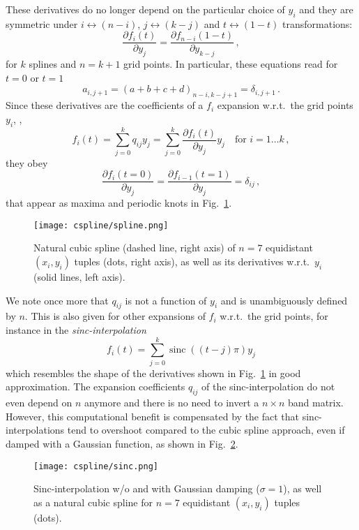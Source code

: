 These derivatives do no longer depend on the particular choice of $y_i$ and they are symmetric under $i \leftrightarrow (n-i)$, $j \leftrightarrow (k-j)$ and $t \leftrightarrow (1-t)$ transformations:
\begin{equation*}
    \frac{\partial f_i(t)}{\partial y_j} = \frac{\partial f_{n-i}(1-t)}{\partial y_{k-j}} \,,
\end{equation*}
for $k$ splines and $n=k+1$ grid points.
In particular, these equations read for $t=0$ or $t=1$
\begin{equation*}
    a_{i,j+1} = (a + b + c + d)_{n-i,k-j+1} = \delta_{i,j+1} \,.
\end{equation*}
Since these derivatives are the coefficients of a $f_i$ expansion w.r.t.\ the grid points $y_i$, \ie{},
\begin{equation*}
    f_i(t) = \sum_{j=0}^k q_{ij} y_j = \sum_{j=0}^k \frac{\partial f_i(t)}{\partial y_j} y_j \quad \text{for }i=1 \ldots k \,,
\end{equation*}
they obey
\begin{equation*}
    \frac{\partial f_i(t=0)}{\partial y_j} = \frac{\partial f_{i-1}(t=1)}{\partial y_j} = \delta_{ij} \,,
\end{equation*}
that appear as maxima and periodic knots in Fig.~\ref{fig:cspline_derivs}.
\begin{figure}[htbp]
    \centering
    \texttt{[image: cspline/spline.png]}
    \caption{Natural cubic spline (dashed line, right axis) of $n=7$ equidistant $(x_i, y_i)$ tuples (dots, right axis), as well as its derivatives w.r.t.\ $y_i$ (solid lines, left axis).}
    \label{fig:cspline_derivs}
\end{figure}

We note once more that $q_{ij}$ is not a function of $y_i$ and is unambiguously defined by $n$.
This is also given for other expansions of $f_i$ w.r.t.\ the grid points, for instance in the \textit{sinc-interpolation}
\begin{equation*}
    f_i(t) = \sum_{j=0}^k \operatorname{sinc}((t - j) \pi) y_j
\end{equation*}
which resembles the shape of the derivatives shown in Fig.~\ref{fig:cspline_derivs} in good approximation.
The expansion coefficients $q_{ij}$ of the sinc-interpolation do not even depend on $n$ anymore and there is no need to invert a $n \times n$ band matrix.
However, this computational benefit is compensated by the fact that sinc-interpolations tend to overshoot compared to the cubic spline approach, even if damped with a Gaussian function, as shown in Fig.~\ref{fig:cspline_sinc}.
\begin{figure}[htbp]
    \centering
    \texttt{[image: cspline/sinc.png]}
    \caption{Sinc-interpolation w/o and with Gaussian damping ($\sigma=1$), as well as a natural cubic spline for $n=7$ equidistant $(x_i,y_i)$ tuples (dots).}
    \label{fig:cspline_sinc}
\end{figure}
